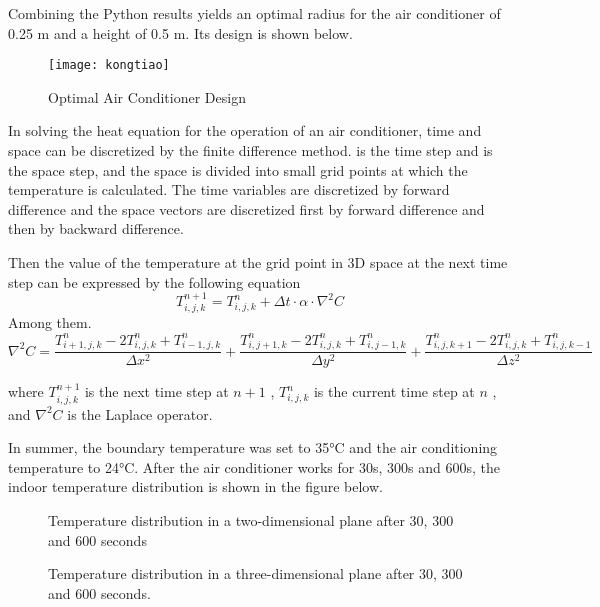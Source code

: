 \documentclass{apmcmthesis}
\begin{document}
Combining the Python results yields an optimal radius for the air conditioner of 0.25 m and a height of 0.5 m. Its design is shown below.
\begin{figure}[H]
	\centering
	\texttt{[image: kongtiao]}%
	\caption{Optimal Air Conditioner Design} %
\end{figure}

In solving the heat equation for the operation of an air conditioner, time and space can be discretized by the finite difference method.  is the time step and  is the space step, and the space is divided into small grid points at which the temperature is calculated. The time variables are discretized by forward difference and the space vectors are discretized first by forward difference and then by backward difference.

Then the value of the temperature at the grid point  in 3D space at the next time step can be expressed by the following equation
\begin{equation}
	T_{i,j,k}^{n + 1} = T_{i,j,k}^n + \Delta t \cdot \alpha  \cdot {\nabla ^2}C
\end{equation}
Among them.
\begin{equation}
	{\nabla ^2}C = \frac{{T_{i + 1,j,k}^n - 2T_{i,j,k}^n + T_{i - 1,j,k}^n}}{{\Delta {x^2}}} + \frac{{T_{i,j + 1,k}^n - 2T_{i,j,k}^n + T_{i,j - 1,k}^n}}{{\Delta {y^2}}} + \frac{{T_{i,j,k + 1}^n - 2T_{i,j,k}^n + T_{i,j,k - 1}^n}}{{\Delta {z^2}}}
\end{equation}

where $T_{i,j,k}^{n + 1}$ is the next time step at $n + 1$ ,
$T_{i,j,k}^n$ is the current time step at $n$ , and ${\nabla ^2}C$ is the Laplace operator.

In summer, the boundary temperature was set to 35°C and the air conditioning temperature to 24°C. After the air conditioner works for 30s, 300s and 600s, the indoor temperature distribution is shown in the figure below.
\begin{figure}[H]
	\centering    
	\caption{Temperature distribution in a two-dimensional plane after 30, 300 and 600 seconds}		%
\end{figure}
\begin{figure}[H]
	\centering    
	\caption{Temperature distribution in a three-dimensional plane after 30, 300 and 600 seconds.}		%
\end{figure}
\end{document}
